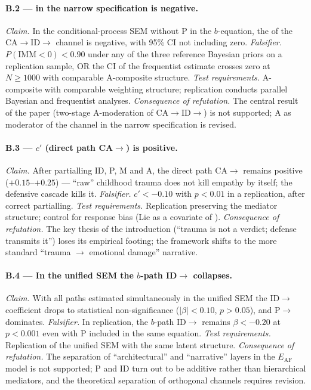 \paragraph{B.2 --- \IMM{} in the narrow specification is negative.}
\emph{Claim.} In the conditional-process SEM without P in the $b$-equation, the \IMM{} of the CA$\to$ID$\to$\EAF{} channel is negative, with 95\% CI not including zero.
\emph{Falsifier.} $P(\mathrm{IMM} < 0) < 0.90$ under any of the three reference Bayesian priors on a replication sample, OR the CI of the frequentist estimate crosses zero at $N \geq 1000$ with comparable A-composite structure.
\emph{Test requirements.} A-composite with comparable weighting structure; replication conducts parallel Bayesian and frequentist analyses.
\emph{Consequence of refutation.} The central result of the paper (two-stage A-moderation of CA$\to$ID$\to$\EAF) is not supported; A as moderator of the channel in the narrow specification is revised.

\paragraph{B.3 --- $c'$ (direct path CA$\to$\EAF{}) is positive.}
\emph{Claim.} After partialling ID, P, M and A, the direct path CA$\to$\EAF{} remains positive ($+0.15$--$+0.25$) --- ``raw'' childhood trauma does not kill empathy by itself; the defensive cascade kills it.
\emph{Falsifier.} $c' < -0.10$ with $p < 0.01$ in a replication, after correct partialling.
\emph{Test requirements.} Replication preserving the mediator structure; control for response bias (Lie as a covariate of \EAF).
\emph{Consequence of refutation.} The key thesis of the introduction (``trauma is not a verdict; defense transmits it'') loses its empirical footing; the \DEIC{} framework shifts to the more standard ``trauma $\to$ emotional damage'' narrative.

\paragraph{B.4 --- In the unified SEM the $b$-path ID$\to$\EAF{} collapses.}
\emph{Claim.} With all paths estimated simultaneously in the unified SEM the ID$\to$\EAF{} coefficient drops to statistical non-significance ($|\beta| < 0.10$, $p > 0.05$), and P$\to$\EAF{} dominates.
\emph{Falsifier.} In replication, the $b$-path ID$\to$\EAF{} remains $\beta < -0.20$ at $p < 0.001$ even with P included in the same equation.
\emph{Test requirements.} Replication of the unified SEM with the same latent structure.
\emph{Consequence of refutation.} The separation of ``architectural'' and ``narrative'' layers in the $E_{\mathrm{AF}}$ model is not supported; P and ID turn out to be additive rather than hierarchical mediators, and the theoretical separation of orthogonal channels requires revision.

